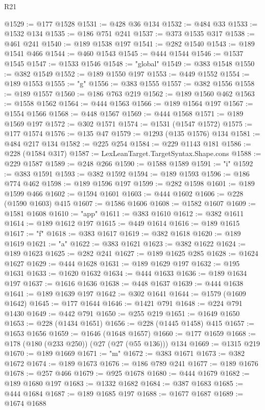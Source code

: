 \begin{lexlean}{R21}
\begin{coremodule}
@1529 := @177 @1528
@1531 := @428 @36 @134
@1532 := @484 @33
@1533 := @1532 @134
@1535 := @186 @751 @241
@1537 := @373 @1535 @317
@1538 := @461 @241
@1540 := @189 @1538 @197
@1541 := @282 @1540
@1543 := @189 @1541 @466
@1544 := @460 @1543
@1545 := @444 @1544
@1546 := @1537 @1545
@1547 := @1533 @1546
@1548 := "global"
@1549 := @383 @1548
@1550 := @382 @1549
@1552 := @189 @1550 @197
@1553 := @449 @1552
@1554 := @189 @1553
@1555 := "g"
@1556 := @383 @1555
@1557 := @382 @1556
@1558 := @189 @1557
@1560 := @186 @763 @219
@1562 := @189 @1560 @462
@1563 := @1558 @1562
@1564 := @444 @1563
@1566 := @189 @1564 @197
@1567 := @1554 @1566
@1568 := @448 @1567
@1569 := @444 @1568
@1571 := @189 @1569 @197
@1572 := @302 @1571
@1574 := @1531 (@1547 @1572)
@1575 := @177 @1574
@1576 := @135 @47
@1579 := @1293 (@135 @1576) @134
@1581 := @484 @217 @134
@1582 := @225 @254
@1584 := @229 @1143 @181
@1586 := @228 (@1584 @317)
@1587 := LexLeanTarget.TargetSyntax.Shape.cons
@1588 := @229 @1587
@1589 := @248 @266
@1590 := @1588 @1589
@1591 := "i"
@1592 := @383 @1591
@1593 := @382 @1592
@1594 := @189 @1593
@1596 := @186 @774 @462
@1598 := @189 @1596 @197
@1599 := @282 @1598
@1601 := @189 @1599 @466
@1602 := @1594 @1601
@1603 := @444 @1602
@1606 := @228 (@1590 @1603) @415
@1607 := @1586 @1606
@1608 := @1582 @1607
@1609 := @1581 @1608
@1610 := "app"
@1611 := @383 @1610
@1612 := @382 @1611
@1614 := @189 @1612 @197
@1615 := @449 @1614
@1616 := @189 @1615
@1617 := "f"
@1618 := @383 @1617
@1619 := @382 @1618
@1620 := @189 @1619
@1621 := "a"
@1622 := @383 @1621
@1623 := @382 @1622
@1624 := @189 @1623
@1625 := @282 @241
@1627 := @189 @1625 @285
@1628 := @1624 @1627
@1629 := @444 @1628
@1631 := @189 @1629 @197
@1632 := @195 @1631
@1633 := @1620 @1632
@1634 := @444 @1633
@1636 := @189 @1634 @197
@1637 := @1616 @1636
@1638 := @448 @1637
@1639 := @444 @1638
@1641 := @189 @1639 @197
@1642 := @302 @1641
@1644 := @1579 (@1609 @1642)
@1645 := @177 @1644
@1646 := @1421 @791
@1648 := @224 @791 @1430
@1649 := @442 @791
@1650 := @255 @219
@1651 := @1649 @1650
@1653 := @228 (@1434 @1651)
@1656 := @228 (@1445 @1458) @415
@1657 := @1653 @1656
@1659 := @1646 (@1648 @1657)
@1660 := @177 @1659
@1668 := @178 (@180 (@233 @250)) (@27 (@27 (@55 @136))) @134
@1669 := @1315 @219
@1670 := @189 @1669
@1671 := "m"
@1672 := @383 @1671
@1673 := @382 @1672
@1674 := @189 @1673
@1676 := @186 @789 @241
@1677 := @189 @1676
@1678 := @257 @466
@1679 := @925 @1678
@1680 := @444 @1679
@1682 := @189 @1680 @197
@1683 := @1332 @1682
@1684 := @387 @1683
@1685 := @444 @1684
@1687 := @189 @1685 @197
@1688 := @1677 @1687
@1689 := @1674 @1688

\end{coremodule}
\end{lexlean}

